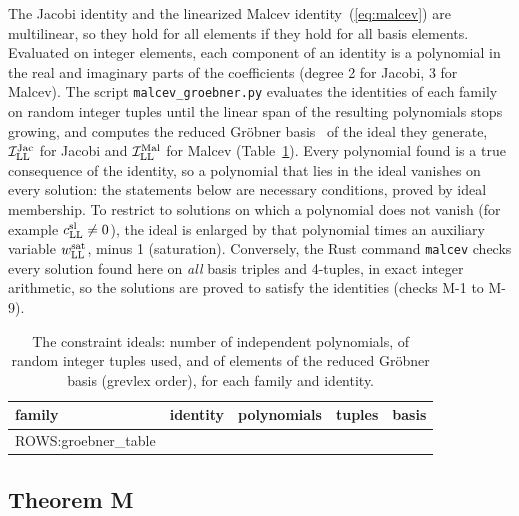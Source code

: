 The Jacobi identity and the linearized Malcev identity~(\ref{eq:malcev}) are multilinear, so they hold
for all elements if they hold for all basis elements. Evaluated on integer elements, each component of
an identity is a polynomial in the real and imaginary parts of the coefficients (degree 2 for Jacobi,
3 for Malcev). The script \texttt{malcev\_groebner.py} evaluates the identities of each family on
random integer tuples until the linear span of the resulting polynomials stops growing, and computes
the reduced Gr\"obner basis~\cite{CoxLittleOShea2015} of the ideal they generate,
$\mathcal I^{\rm Jac}_{\rm LL}$ for Jacobi and $\mathcal I^{\rm Mal}_{\rm LL}$ for Malcev
(Table~\ref{tab:groebner}). Every polynomial found is a true consequence of the identity, so a
polynomial that lies in the ideal vanishes on every solution: the statements below are necessary
conditions, proved by ideal membership. To restrict to solutions on which a polynomial does not
vanish (for example $c^{\rm sl}_{\rm LL}\neq0$), the ideal is enlarged by that polynomial times an
auxiliary variable $w^{\rm sat}_{\rm LL}$, minus 1 (saturation). Conversely, the Rust command
\texttt{malcev} checks every solution found here on \emph{all} basis triples and 4-tuples, in exact
integer arithmetic, so the solutions are proved to satisfy the identities (checks M-1 to M-9).

\begin{table}[t]
\caption{The constraint ideals: number of independent polynomials, of random integer tuples used, and
of elements of the reduced Gr\"obner basis (grevlex order), for each family and identity.}
\label{tab:groebner}
\begin{ruledtabular}
\begin{tabular}{lcccc}
family & identity & polynomials & tuples & basis\\
\hline
{{ROWS:groebner_table}}
\end{tabular}
\end{ruledtabular}
\end{table}

\subsection{Theorem M}

